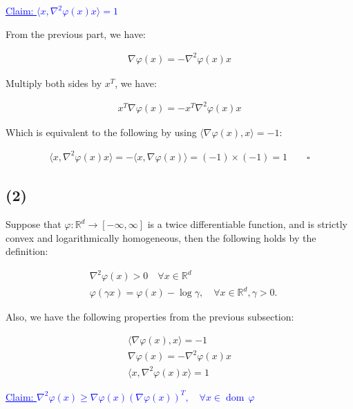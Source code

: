 \documentclass{article}
\begin{document}
\textcolor{blue}{\underline{Claim: $\langle x, \nabla^2 \varphi (x) x \rangle = 1$ } }
\bigskip

From the previous part, we have:

\begin{align*}
    \nabla \varphi (x) = - \nabla^2 \varphi (x) x
\end{align*}

Multiply both sides by $x^T$, we have:

\begin{align*}
    x^T \nabla \varphi (x) = - x^T \nabla^2 \varphi (x) x
\end{align*}

Which is equivalent to the following by using $\langle \nabla \varphi (x), x \rangle = - 1$:

\begin{align*}
    \langle x, \nabla^2 \varphi (x) x \rangle = - \langle x, \nabla \varphi (x) \rangle = (-1) \times (-1) = 1 \qquad \square
\end{align*}

\subsection*{(2)}

Suppose that $\varphi: \mathbb{R}^d \to [- \infty, \infty]$ is a twice differentiable function, 
and is strictly convex and logarithmically homogeneous, then the following holds by the definition:

\begin{align*}
    &\nabla^2 \varphi (x) > 0 \quad \forall x \in \mathbb{R}^d \\
    &\varphi ( \gamma x ) = \varphi (x) - \log \gamma, \quad \forall x \in \mathbb{R}^d, \gamma > 0.
\end{align*}

Also, we have the following properties from the previous subsection:

\begin{align*}
    \langle \nabla \varphi (x), x \rangle = - 1 \tag{1}\\
    \nabla \varphi (x) = - \nabla^2 \varphi ( x ) x \tag{2}\\
    \langle x, \nabla^2 \varphi (x) x \rangle = 1 \tag{3}
\end{align*}

\textcolor{blue}{\underline{Claim: $\nabla^2 \varphi ( x ) \geq \nabla \varphi ( x ) \left( \nabla \varphi (x) \right)^T , \quad \forall x \in \operatorname{dom}\, \varphi $} }
\bigskip
\end{document}
